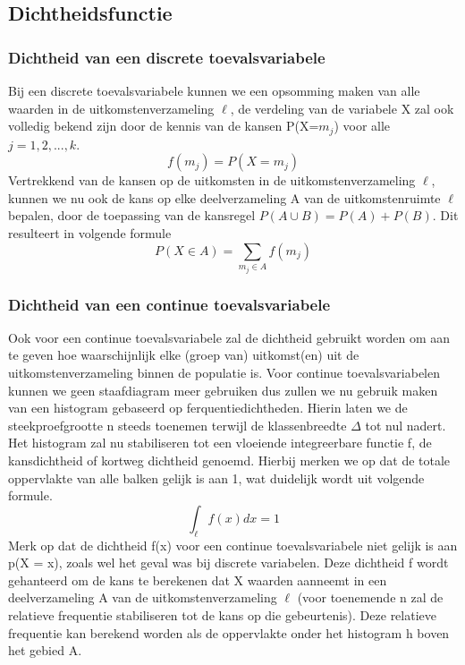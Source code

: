 \documentclass[titlepage]{article}
\numberwithin{equation}{section}
\begin{document}
 \subsection{Dichtheidsfunctie}
 \subsubsection{Dichtheid van een discrete toevalsvariabele}
 Bij een discrete toevalsvariabele kunnen we een opsomming maken van alle waarden in de uitkomstenverzameling $\ell$, de verdeling van de variabele X zal ook volledig bekend zijn door de kennis van de kansen P(X=$m_j$) voor alle $j=1, 2, ... , k$.
 \begin{equation}
 	f(m_j) = P(X = m_j)
 	\label{3.11}
 \end{equation}
 Vertrekkend van de kansen op de uitkomsten in de uitkomstenverzameling $\ell$, kunnen we nu ook de kans op elke deelverzameling A van de uitkomstenruimte $\ell$ bepalen, door de toepassing van de kansregel $P(A\cup B)=P(A) + P(B)$. Dit resulteert in volgende formule
 \begin{equation}
 	P(X \in A) = \sum_{m_j\in A}f(m_j)
 	\label{3.12}
 \end{equation}
 \subsubsection{Dichtheid van een continue toevalsvariabele}
 Ook voor een continue toevalsvariabele zal de dichtheid gebruikt worden om aan te geven hoe waarschijnlijk elke (groep van) uitkomst(en) uit de uitkomstenverzameling binnen de populatie is. Voor continue toevalsvariabelen kunnen we geen staafdiagram meer gebruiken dus zullen we nu gebruik maken van een histogram gebaseerd op ferquentiedichtheden. Hierin laten we de steekproefgrootte n steeds toenemen terwijl de klassenbreedte $\Delta$ tot nul nadert. Het histogram zal nu stabiliseren tot een vloeiende integreerbare functie f, de kansdichtheid of kortweg dichtheid genoemd. Hierbij merken we op dat de totale oppervlakte van alle balken gelijk is aan 1, wat duidelijk wordt uit volgende formule.
 \begin{equation}
 	\int_\ell f(x)dx = 1
 	\label{3.13}
 \end{equation}
 \danger Merk op dat de dichtheid f(x) voor een continue toevalsvariabele niet gelijk is aan p(X = x), zoals wel het geval was bij discrete variabelen.\newline\newline
 Deze dichtheid f wordt gehanteerd om de kans te berekenen dat X waarden aanneemt in een deelverzameling A van de uitkomstenverzameling $\ell$ (voor toenemende n zal de relatieve frequentie stabiliseren tot de kans op die gebeurtenis). Deze relatieve frequentie kan berekend worden als de oppervlakte onder het histogram h boven het gebied A.
\end{document}
